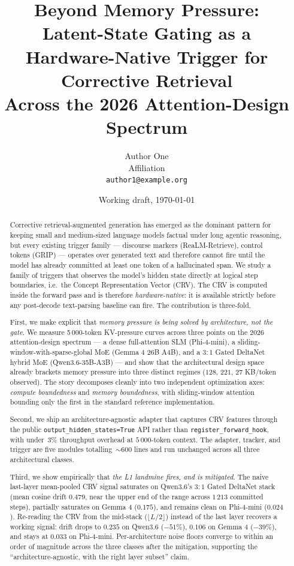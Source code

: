 \documentclass[11pt,letterpaper]{article}
\title{
  Beyond Memory Pressure: \\[2pt]
  Latent-State Gating as a Hardware-Native Trigger for Corrective Retrieval \\
  Across the 2026 Attention-Design Spectrum
}
\author{%
  Author One \\
  Affiliation \\
  \texttt{author1@example.org}
}
\date{Working draft, \today}
\begin{document}
\maketitle

\begin{abstract}
\noindent
Corrective retrieval-augmented generation \citep{TODO:CRAG, TODO:SelfRAG}
has emerged as the dominant pattern for keeping small and medium-sized
language models factual under long agentic reasoning, but every existing
trigger family — discourse markers (ReaLM-Retrieve), control tokens (GRIP)
\citep{TODO:realm-retrieve, TODO:grip} — operates over generated text and
therefore cannot fire until the model has already committed at least one
token of a hallucinated span. We study a family of triggers that observes
the model's hidden state directly at logical step boundaries, i.e.~the
Concept Representation Vector (CRV). The CRV is computed inside the
forward pass and is therefore \emph{hardware-native}: it is available
strictly before any post-decode text-parsing baseline can fire. The
contribution is three-fold.

First, we make explicit that \emph{memory pressure is being solved by
architecture, not the gate}. We measure 5\,000-token KV-pressure curves
across three points on the 2026 attention-design spectrum — a dense
full-attention SLM (Phi-4-mini), a sliding-window-with-sparse-global MoE
(Gemma 4 26B A4B), and a $3{:}1$ Gated DeltaNet hybrid MoE
(Qwen3.6-35B-A3B) — and show that the architectural design space already
brackets memory pressure into three distinct regimes ($128$, $221$, $27$
KB/token observed). The story decomposes cleanly into two independent
optimization axes: \emph{compute boundedness} and \emph{memory
boundedness}, with sliding-window attention bounding only the first in
the standard reference implementation.

Second, we ship an architecture-agnostic adapter that captures CRV
features through the public \texttt{output\_hidden\_states=True} API
rather than \texttt{register\_forward\_hook}, with under~$3\%$ throughput
overhead at $5\,000$-token context. The adapter, tracker, and trigger
are five modules totalling~${\sim}600$ lines and run unchanged across
all three architectural classes.

Third, we show empirically that \emph{the L1 landmine fires, and is
mitigated}. The naive last-layer mean-pooled CRV signal saturates on
Qwen3.6's $3{:}1$ Gated DeltaNet stack (mean cosine drift $0.479$, near
the upper end of the range across $1\,213$ committed steps), partially
saturates on Gemma 4 ($0.175$), and remains clean on Phi-4-mini
($0.024$). Re-reading the CRV from the
mid-stack ($\lfloor L/2\rfloor$) instead of the last layer recovers a
working signal: drift drops to $0.235$ on Qwen3.6 ($-51\%$), $0.106$
on Gemma 4 ($-39\%$), and stays at $0.033$ on Phi-4-mini.
Per-architecture noise floors converge to within an order of magnitude
across the three classes after the mitigation, supporting the
``architecture-agnostic, with the right layer subset'' claim.


\end{abstract}
\end{document}
